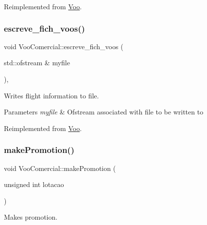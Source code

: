 Reimplemented from \hyperlink{class_voo_ae8c7d7254ca23ed23f762a9b867aba91}{Voo}.

\mbox{\label{class_voo_comercial_a813f44820fa19d9cecf38e1dfcd28c2d}} 
\subsubsection{\texorpdfstring{escreve\+\_\+fich\+\_\+voos()}{escreve\_fich\_voos()}}
{\footnotesize\ttfamily void Voo\+Comercial\+::escreve\+\_\+fich\+\_\+voos (\begin{DoxyParamCaption}\item[{std\+::ofstream \&}]{myfile }\end{DoxyParamCaption})\hspace{0.3cm}{\ttfamily [inline]}, {\ttfamily [virtual]}}



Writes flight information to file. 


\begin{DoxyParams}{Parameters}
{\em myfile} & Ofstream associated with file to be written to \\
\hline
\end{DoxyParams}


Reimplemented from \hyperlink{class_voo_a3268d6d5ac51e31ebbdb11fd637544c1}{Voo}.

\mbox{\label{class_voo_comercial_a08756e081cbce8c76cc29a3ffec15aab}} 
\subsubsection{\texorpdfstring{make\+Promotion()}{makePromotion()}}
{\footnotesize\ttfamily void Voo\+Comercial\+::make\+Promotion (\begin{DoxyParamCaption}\item[{unsigned int}]{lotacao }\end{DoxyParamCaption})\hspace{0.3cm}{\ttfamily [virtual]}}



Makes promotion. 

